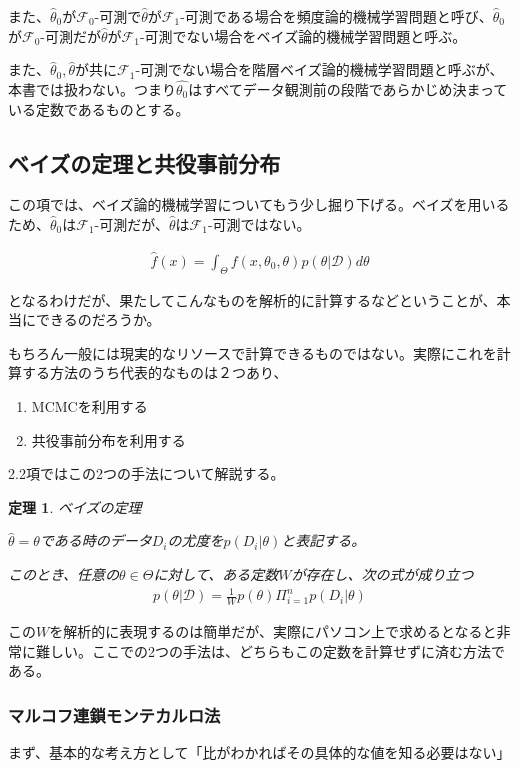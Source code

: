 \documentclass[dvipdfmx, a4paper]{jsarticle}
\newtheorem{theo}{定理}[section]
\begin{document}
また、$\hat{\theta}_0$が$\mathcal{F}_0$-可測で$\hat{\theta}$が$\mathcal{F}_1$-可測である場合を頻度論的機械学習問題と呼び、$\hat{\theta}_0$が$\mathcal{F}_0$-可測だが$\hat{\theta}$が$\mathcal{F}_1$-可測でない場合をベイズ論的機械学習問題と呼ぶ。

また、$\hat{\theta}_0,\hat{\theta}$が共に$\mathcal{F}_1$-可測でない場合を階層ベイズ論的機械学習問題と呼ぶが、本書では扱わない。つまり$\hat{\theta_0}$はすべてデータ観測前の段階であらかじめ決まっている定数であるものとする。

\subsection{ベイズの定理と共役事前分布}
この項では、ベイズ論的機械学習についてもう少し掘り下げる。ベイズを用いるため、$\hat{\theta}_0$は$\mathcal{F}_1$-可測だが、$\hat{\theta}$は$\mathcal{F}_1$-可測ではない。

\begin{align}
\hat{f}(x)=\int_\Theta f(x,\theta_0,\theta)p(\theta|\mathcal{D})d\theta
\end{align}

となるわけだが、果たしてこんなものを解析的に計算するなどということが、本当にできるのだろうか。

もちろん一般には現実的なリソースで計算できるものではない。実際にこれを計算する方法のうち代表的なものは２つあり、
\begin{enumerate}
\item MCMCを利用する
\item 共役事前分布を利用する
\end{enumerate}

2.2項ではこの2つの手法について解説する。

\begin{theo}ベイズの定理

$\hat{\theta}=\theta$である時のデータ$D_i$の尤度を$p(D_i|\theta)$と表記する。

このとき、任意の$\theta\in\Theta$に対して、ある定数$W$が存在し、次の式が成り立つ
\begin{align}
p(\theta|\mathcal{D})=\frac{1}{W}p(\theta)\Pi^n_{i=1}p(D_i|\theta)
\end{align}
\end{theo}
この$W$を解析的に表現するのは簡単だが、実際にパソコン上で求めるとなると非常に難しい。ここでの2つの手法は、どちらもこの定数を計算せずに済む方法である。
\subsubsection{マルコフ連鎖モンテカルロ法}
まず、基本的な考え方として「比がわかればその具体的な値を知る必要はない」
\end{document}
